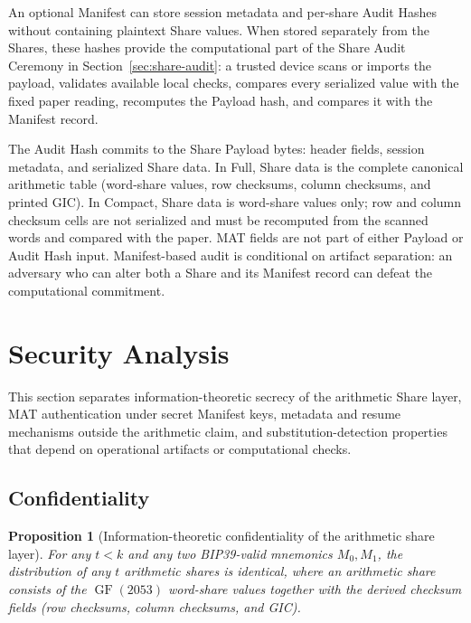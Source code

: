 \documentclass[11pt]{article}
\newcommand{\GF}{\operatorname{GF}}
\newtheorem{proposition}[theorem]{Proposition}
\begin{document}
An optional Manifest can store session metadata and per-share Audit Hashes without containing plaintext Share values. When stored separately from the Shares, these hashes provide the computational part of the Share Audit Ceremony in Section~\ref{sec:share-audit}: a trusted device scans or imports the payload, validates available local checks, compares every serialized value with the fixed paper reading, recomputes the Payload hash, and compares it with the Manifest record.

The Audit Hash commits to the Share Payload bytes: header fields, session metadata, and serialized Share data. In Full, Share data is the complete canonical arithmetic table (word-share values, row checksums, column checksums, and printed GIC). In Compact, Share data is word-share values only; row and column checksum cells are not serialized and must be recomputed from the scanned words and compared with the paper. MAT fields are not part of either Payload or Audit Hash input. Manifest-based audit is conditional on artifact separation: an adversary who can alter both a Share and its Manifest record can defeat the computational commitment.

\section{Security Analysis}
\label{sec:security}

This section separates information-theoretic secrecy of the arithmetic Share layer, MAT authentication under secret Manifest keys, metadata and resume mechanisms outside the arithmetic claim, and substitution-detection properties that depend on operational artifacts or computational checks.

\subsection{Confidentiality}

\begin{proposition}[Information-theoretic confidentiality of the arithmetic share layer]
\label{prop:conf}
For any $t < k$ and any two BIP39-valid mnemonics $M_0, M_1$, the distribution of any $t$ arithmetic shares is identical, where an arithmetic share consists of the $\GF(2053)$ word-share values together with the derived checksum fields (row checksums, column checksums, and GIC).
\end{proposition}
\end{document}
